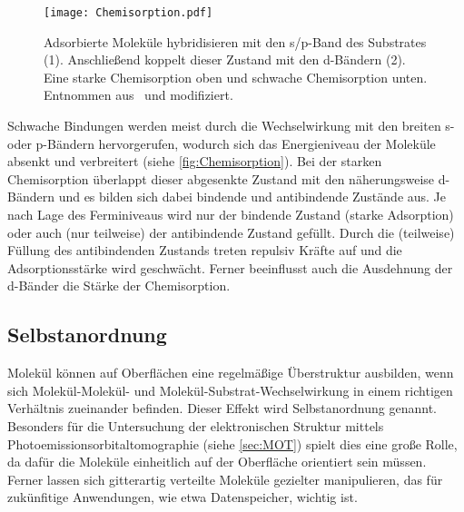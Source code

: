             \begin{figure}
                \centering
                \texttt{[image: Chemisorption.pdf]}
                \caption{Adsorbierte Moleküle hybridisieren mit den s/p-Band des Substrates (1).
                Anschließend koppelt dieser Zustand mit den d-Bändern (2).
                Eine starke Chemisorption oben und schwache Chemisorption unten.
                Entnommen aus~\cite{IF_1} und modifiziert.}
                \label{fig:Chemisorption}
            \end{figure}
            Schwache Bindungen werden meist durch die Wechselwirkung mit den breiten s- oder p-Bändern hervorgerufen, wodurch sich das Energieniveau der Moleküle absenkt und verbreitert (siehe \autoref{fig:Chemisorption}).
            Bei der starken Chemisorption überlappt dieser abgesenkte Zustand mit den näherungsweise d-Bändern und es bilden sich dabei bindende und antibindende Zustände aus.
            Je nach Lage des Ferminiveaus wird nur der bindende Zustand (starke Adsorption) oder auch (nur teilweise) der antibindende Zustand gefüllt.
            Durch die (teilweise) Füllung des antibindenden Zustands treten repulsiv Kräfte auf und die Adsorptionsstärke wird geschwächt.
            Ferner beeinflusst auch die Ausdehnung der d-Bänder die Stärke der Chemisorption.

        \subsection{Selbstanordnung} \label{sec:Selbstanordnung}
            Molekül können auf Oberflächen eine regelmäßige Überstruktur ausbilden, wenn sich Molekül-Molekül- und Molekül-Substrat-Wechselwirkung in einem richtigen Verhältnis zueinander befinden.
            Dieser Effekt wird Selbstanordnung genannt.
            Besonders für die Untersuchung der elektronischen Struktur mittels Photoemissionsorbitaltomographie (siehe \autoref{sec:MOT}) spielt dies eine große Rolle, da dafür die Moleküle einheitlich auf der Oberfläche orientiert sein müssen.
            Ferner lassen sich gitterartig verteilte Moleküle gezielter manipulieren, das für zukünfitige Anwendungen, wie etwa Datenspeicher, wichtig ist.
            
